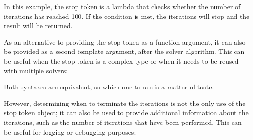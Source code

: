 \documentclass[letterpaper,10pt,english]{sphinxmanual}
\begin{document}
\sphinxAtStartPar
In this example, the stop token is a lambda that checks whether the number of iterations has reached 100. If the condition is met, the iterations will stop and the result will be returned.

\sphinxAtStartPar
As an alternative to providing the stop token as a function argument, it can also be provided as a second template argument, after the solver algorithm. This can be useful when the stop token is a complex type or when it needs to be reused with multiple solvers:

\begin{sphinxVerbatim}[commandchars=\\\{\}]
\PYG{p}{[}\PYG{p}{]}
\PYG{p}{[}\PYG{p}{]}
\end{sphinxVerbatim}

\sphinxAtStartPar
Both syntaxes are equivalent, so which one to use is a matter of taste.

\sphinxAtStartPar
However, determining when to terminate the iterations is not the only use of the stop token object; it can also be used to provide additional information about the iterations, such as the number of iterations that have been performed. This can be useful for logging or debugging purposes:
\end{document}
